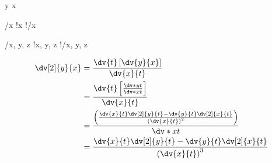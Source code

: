  \dv y x

 \quad {}





 \quad {}/{x} \quad {}!{x} \quad {}!/{x}

 \quad {} \quad {} \quad {}

 \quad {}/{x, y, z} \quad {}!{x, y, z} \quad {}!/{x, y, z}

\begin{align}
\dv[2]{y}{x}&=\frac{\dv{t}\left[\dv{y}{x}\right]}{\dv{x}{t}} \\
            &=\frac{\dv{t}\left[\frac{\dv*{y}{t}}{\dv*{x}{t}}\right]}{\dv{x}{t}} \\
            &=\frac{\left(\frac{\dv{x}{t}\dv[2]{y}{t} - \dv{y}{t}\dv[2]{x}{t}}{\left(\dv{x}{t}\right)^2}\right)}{\dv*{x}{t}} \\
            &=\frac{\dv{x}{t}\dv[2]{y}{t} - \dv{y}{t}\dv[2]{x}{t}}{\left(\dv{x}{t}\right)^3}
\end{align}
